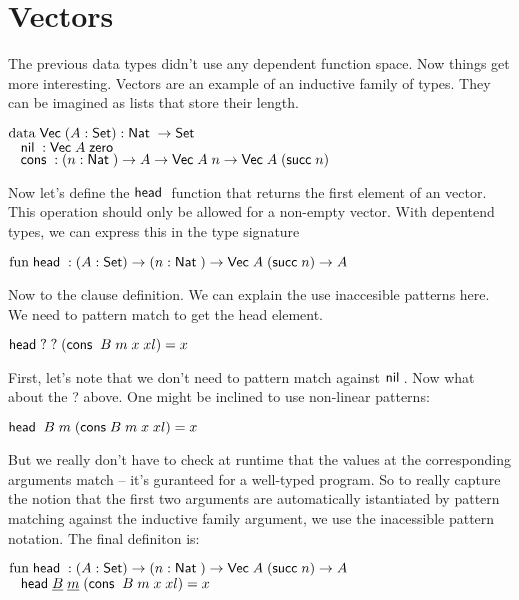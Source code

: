 \section{Vectors}
The previous data types didn't use any dependent function space. 
Now things get more interesting. Vectors are an example of an inductive family of types.
They can be imagined as lists that store their length.
\begin{bsp}
$\mathrm{data}\; \mathsf{Vec}\; ( A : \mathsf{Set} ) : \mathsf{Nat}\; \rightarrow \mathsf{Set} $ \\
$\hspace*{3mm} \mathsf{nil}\; : \mathsf{Vec}\; A \; \mathsf{zero}\;  $\\
$ \hspace*{3mm} \mathsf{cons}\; : ( n : \mathsf{Nat}\; ) \rightarrow{ A \rightarrow\mathsf{Vec}\;A \; n \rightarrow\mathsf{Vec}\;A \; (\mathsf{succ}\;n)} $
\end{bsp}
Now let's define the $\mathsf{head}\;$ function that returns the first element of an vector. This operation should only be allowed for a non-empty vector.
With depentend types, we can express this in the type signature
\begin{bsp}
$ \mathrm{fun}\; \mathsf{head}\; : ( A : \mathsf{Set} ) \rightarrow ( n : \mathsf{Nat}\; ) \rightarrow \mathsf{Vec}\; A \; (\mathsf{succ}\; n) \rightarrow A $
\end{bsp}
Now to the clause definition. We can explain the use inaccesible patterns here.
We need to pattern match to get the head element.
\begin{bsp}
$\mathsf{head}\; ? \; ? \; (\mathsf{cons}\; \; B \; m \; x \; xl) = x $
\end{bsp}
First, let's note that we don't need to pattern match against $\mathsf{nil}\;$.
Now what about the ? above. 
One might be inclined to use non-linear patterns:
\begin{bsp}
$\mathsf{head}\; \; B \; m \; (\mathsf{cons}\;  B \; m \; x \; xl) = x $
\end{bsp}
But we really don't have to check at runtime that the values at the corresponding arguments match -- it's guranteed for a well-typed program.
So to really capture the notion that the first two arguments are automatically istantiated by pattern matching against the inductive family argument, we use the inacessible pattern notation. The final definiton is:
\begin{bsp}
$ \mathrm{fun}\; \mathsf{head}\; : ( A : \mathsf{Set} ) \rightarrow ( n : \mathsf{Nat}\; ) \rightarrow \mathsf{Vec}\; A \; (\mathsf{succ}\; n) \rightarrow A $\\
$ \hspace*{3mm} \mathsf{head}\; \underline{B} \; \underline{m} \; (\mathsf{cons}\; \; B \; m \; x \; xl) = x $
\end{bsp}

